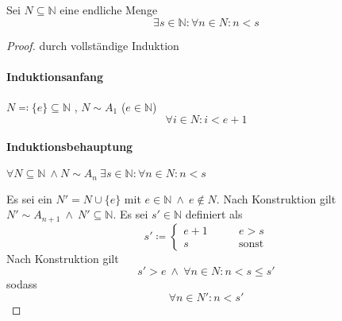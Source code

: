 \documentclass[a4paper, 12pt]{scrartcl}
\begin{document}
\begin{lemma}\label{max}
Sei $N \subseteq \mathbb{N}$ eine endliche Menge
	\[ \exists s \in \mathbb{N} : \forall n \in N : n < s \]
\end{lemma}
\begin{proof}
durch vollständige Induktion
\paragraph*{Induktionsanfang} $N \eqqcolon \{e\} \subseteq \mathbb{N}$ , $N \sim A_1$ \hfill ($e \in \mathbb{N}$)
\[ \forall i \in N : i < e+1 \]
\paragraph*{Induktionsbehauptung} $\forall N \subseteq \mathbb{N}\:\wedge N \sim A_n\ \exists s \in \mathbb{N} : \forall n \in N : n < s$

Es sei ein $N' = N \cup \{e\}$ mit $e \in \mathbb{N} \:\wedge\:e \notin N$. Nach Konstruktion gilt $N' \sim A_{n+1}\:\wedge\:N' \subseteq \mathbb{N}$.
Es sei $s' \in \mathbb{N}$ definiert als
\[ s' \coloneqq \begin{cases}
	e+1 &\qquad e > s\\
	s &\qquad \text{sonst}
\end{cases} \]
Nach Konstruktion gilt
\[ s' > e \ \wedge\ \forall n \in N : n < s \leq s'\]
sodass
\[ \forall n \in N' : n < s' \]
\end{proof}
\end{document}
